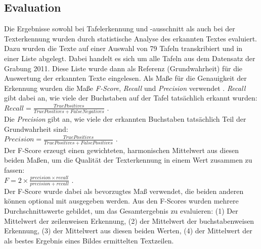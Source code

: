 
\subsection{Evaluation}

Die Ergebnisse sowohl bei Tafelerkennung und -ausschnitt als auch bei der Texterkennung wurden durch statistische Analyse des erkannten Textes evaluiert. Dazu wurden die Texte auf einer Auswahl von 79 Tafeln transkribiert und in einer Liste abgelegt. Dabei handelt es sich um alle Tafeln aus dem Datensatz der Grabung 2011. Diese Liste wurde dann als Referenz (Grundwahrheit) für die Auswertung der erkannten Texte eingelesen.
Als Maße für die Genauigkeit der Erkennung wurden die Maße \textit{F-Score}, \textit{Recall} und \textit{Precision} verwendet\cite{haraldklinke} \cite{qixiangye}. \textit{Recall} gibt dabei an, wie viele der Buchstaben auf der Tafel tatsächlich erkannt wurden:\\$Recall = \frac{True Positives}{True Positives + False Negatives}$ \cite{haraldklinke}.\\Die \textit{Precision} gibt an, wie viele der erkannten Buchstaben tatsächlich Teil der Grundwahrheit sind:\\$Precision = \frac{True Positives}{True Positives + False Positives}$ \cite{haraldklinke}.\\Der F-Score erzeugt einen gewichteten, harmonischen Mittelwert aus diesen beiden Maßen, um die Qualität der Texterkennung in einem Wert zusammen zu fassen:\\$F = 2 \times \frac{precision \times recall}{precision + recall}$ \cite{haraldklinke}.\\Der F-Score wurde dabei als bevorzugtes Maß verwendet, die beiden anderen können optional mit ausgegeben werden. Aus den F-Scores wurden mehrere Durchschnittswerte gebildet, um das Gesamtergebnis zu evaluieren: (1) Der Mittelwert der zeilenweisen Erkennung, (2) der Mittelwert der buchstabenweisen Erkennung, (3) der Mittelwert aus diesen beiden Werten, (4) der Mittelwert der als bestes Ergebnis eines Bildes ermittelten Textzeilen.